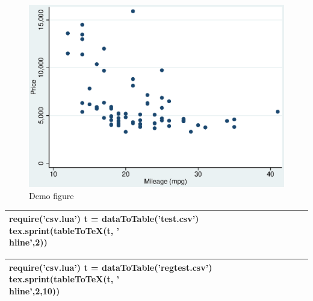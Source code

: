 \documentclass[a4paper]{article}
\begin{document}
\begin{figure}
\centering
\includegraphics[width=1\textwidth]{figure.eps}
\caption{\label{fig:figure}Demo figure}
\end{figure}

\begin{table}
\centering
\begin{tabular}{lrrrrrrr}
  \hline
  \luaexec{
    require('csv.lua')
    t = dataToTable('test.csv')
    tex.sprint(tableToTeX(t, '\\hline',{2}))
    } \\
  \hline
  \end{tabular}
\end{table}

\begin{table}
\centering
\begin{tabular}{l|rrrrrrr}
  \hline
  \luaexec{
    require('csv.lua')
    t = dataToTable('regtest.csv')
    tex.sprint(tableToTeX(t, '\\hline',{2,10}))
    } \\
  \hline
  \end{tabular}
\end{table}
\end{document}
